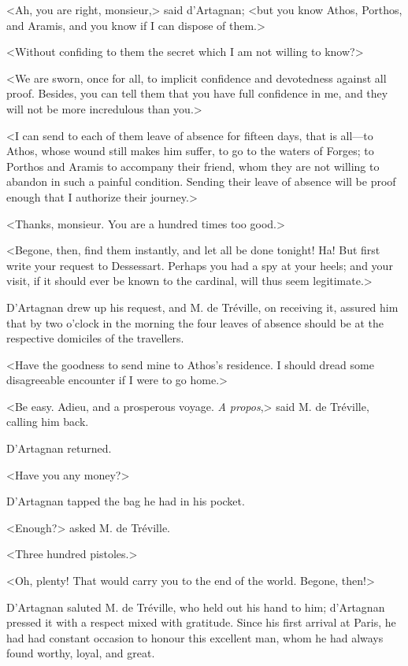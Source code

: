 <Ah, you are right, monsieur,> said d'Artagnan; <but you know Athos, Porthos, and Aramis, and you know if I can dispose of them.> 

<Without confiding to them the secret which I am not willing to know?> 

<We are sworn, once for all, to implicit confidence and devotedness against all proof. Besides, you can tell them that you have full confidence in me, and they will not be more incredulous than you.> 

<I can send to each of them leave of absence for fifteen days, that is all---to Athos, whose wound still makes him suffer, to go to the waters of Forges; to Porthos and Aramis to accompany their friend, whom they are not willing to abandon in such a painful condition. Sending their leave of absence will be proof enough that I authorize their journey.> 

<Thanks, monsieur. You are a hundred times too good.> 

<Begone, then, find them instantly, and let all be done tonight! Ha! But first write your request to Dessessart. Perhaps you had a spy at your heels; and your visit, if it should ever be known to the cardinal, will thus seem legitimate.> 

D'Artagnan drew up his request, and M. de Tréville, on receiving it, assured him that by two o'clock in the morning the four leaves of absence should be at the respective domiciles of the travellers. 

<Have the goodness to send mine to Athos's residence. I should dread some disagreeable encounter if I were to go home.> 

<Be easy. Adieu, and a prosperous voyage. \textit{A propos},> said M. de Tréville, calling him back. 

D'Artagnan returned. 

<Have you any money?> 

D'Artagnan tapped the bag he had in his pocket. 

<Enough?> asked M. de Tréville. 

<Three hundred pistoles.> 

<Oh, plenty! That would carry you to the end of the world. Begone, then!> 

D'Artagnan saluted M. de Tréville, who held out his hand to him; d'Artagnan pressed it with a respect mixed with gratitude. Since his first arrival at Paris, he had had constant occasion to honour this excellent man, whom he had always found worthy, loyal, and great. 

